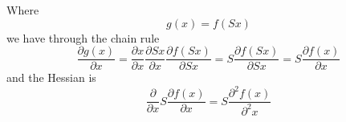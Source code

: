 Where
\[
g(x) = f(Sx)
\]
we have through the chain rule
\[
\frac{\partial g(x)}{ \partial x} = \frac{\partial x}{\partial x} \frac{\partial Sx}{\partial x} \frac{\partial f(Sx)}{\partial Sx} = S \frac{\partial f(Sx)}{\partial Sx} = S \frac{\partial f(x)}{\partial x}
\]
and the Hessian is
\[
\frac{\partial}{\partial x}S \frac{\partial f(x)}{\partial x} = S \frac{\partial^2 f(x)}{\partial^2 x}
\]





































